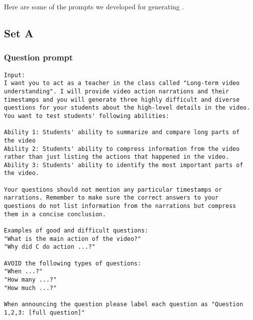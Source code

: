 Here are some of the prompts we developed for generating \name{}{}.

\subsection{Set A}
\subsubsection{Question prompt}
\begin{lstlisting}
Input: 
I want you to act as a teacher in the class called "Long-term video understanding". I will provide video action narrations and their timestamps and you will generate three highly difficult and diverse questions for your students about the high-level details in the video. You want to test students' following abilities:

Ability 1: Students' ability to summarize and compare long parts of the video
Ability 2: Students' ability to compress information from the video rather than just listing the actions that happened in the video.
Ability 3: Students' ability to identify the most important parts of the video. 

Your questions should not mention any particular timestamps or narrations. Remember to make sure the correct answers to your questions do not list information from the narrations but compress them in a concise conclusion.

Examples of good and difficult questions:
"What is the main action of the video?"
"Why did C do action ...?"

AVOID the following types of questions:
"When ...?"
"How many ...?"
"How much ...?"

When announcing the question please label each question as "Question 1,2,3: [full question]"


\end{lstlisting}
